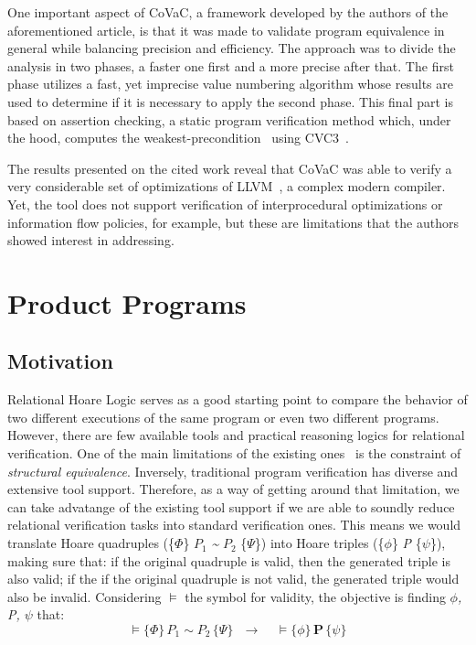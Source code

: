 One important aspect of CoVaC, a framework developed by the authors of the aforementioned article, is that it was made to validate program equivalence in general while balancing precision and efficiency.
The approach was to divide the analysis in two phases, a faster one first and a more precise after that.
The first phase utilizes a fast, yet imprecise value numbering algorithm whose results are used to determine if it is necessary to apply the second phase. 
This final part is based on assertion checking, a static program verification method which, under the hood, computes the weakest-precondition~\cite{DBLP:books/ph/Dijkstra76} using CVC3~\cite{cvc3}. 

The results presented on the cited work reveal that CoVaC was able to verify a very considerable set of optimizations of LLVM~\cite{llvm}, a complex modern compiler.
Yet, the tool does not support verification of interprocedural optimizations or information flow policies, for example, but these are limitations that the authors showed interest in addressing.


\FloatBarrier
\section{Product Programs} 
\label{sec:product_programs}

\subsection{Motivation} 
\label{subsec:product_programs_motivation}

Relational Hoare Logic serves as a good starting point to compare the behavior of two different executions of the same program or even two different programs.
However, there are few available tools and practical reasoning logics for relational verification.
One of the main limitations of the existing ones~\cite{DBLP:conf/popl/Benton04, DBLP:journals/tcs/Yang07} is the constraint of \emph{structural equivalence}.
Inversely, traditional program verification has diverse and extensive tool support.
Therefore, as a way of getting around that limitation, we can take advatange of the existing tool support if we are able to soundly reduce relational verification tasks into standard verification ones.
This means we would translate Hoare quadruples (\{$\Phi$\} \emph{$P_1$} \emph{\textasciitilde} \emph{$P_2$} \{$\Psi$\}) into Hoare triples (\{$\phi$\} \emph{P} \{$\psi$\}), making sure that: if the original quadruple is valid, then the generated triple is also valid; if the if the original quadruple is not valid, the generated triple would also be invalid.
Considering $\vDash$ the symbol for validity, the objective is finding \emph{$\phi$, P, $\psi$} that:
\[ \vDash \{\Phi\} \, \textbf{$P_1$} \sim \textbf{$P_2$} \, \{\Psi\} \ \ \ \rightarrow \ \ \ \ \ \vDash \{\phi\} \, \textbf{P} \, \{\psi\} \]

